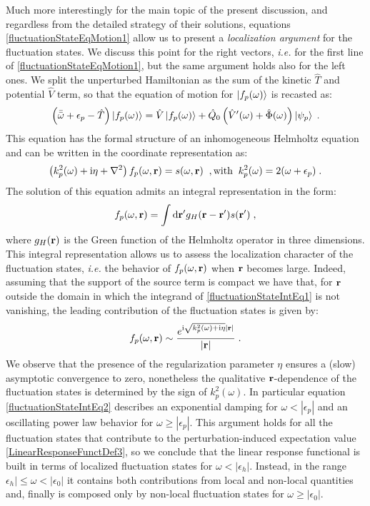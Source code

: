 \documentclass[a4paper]{article}
\newcommand{\dd}{{\rm d}}
\renewcommand{\r}{{\bf r}}
\newcommand{\eps}{\epsilon}
\newcommand{\bbomega}{{\bar{\bar\omega}}}
\newcommand{\ii}{\mathrm{i}}
\newcommand{\be}{\begin{equation}}
\newcommand{\ee}{\end{equation}}
\newcommand{\lb}{\label}
\newcommand{\op}[1]{\hat {#1}}
\begin{document}
Much more interestingly for the main topic of the present discussion, and regardless from the detailed strategy of their solutions, equations \eqref{fluctuationStateEqMotion1} 
allow us to present a \emph{localization argument} for the fluctuation states. We discuss this point for the right vectors, \emph{i.e.} for the first line of \eqref{fluctuationStateEqMotion1}, 
but the same argument holds also for the left ones. We split the unperturbed Hamiltonian as the sum of the kinetic $\op T$ and potential $\op V$ term, so that the equation of motion 
for $\ket{f_p(\omega)}$ is recasted as:
\be\lb{fluctuationStateEqMotion}
\left(\bbomega+\eps_p -\op T\right)\ket{f_p(\omega)} = \op V\ket{f_p(\omega)} + \op Q_0\left(\op V'(\omega) + \op \Phi(\omega)\right)\ket{\psi_p} \;.
\ee
This equation has the formal structure of an inhomogeneous Helmholtz equation and can be written in the coordinate representation as:
\be
\left(k^2_p(\omega)+\ii\eta + \nabla^2\right)f_p(\omega,\r) = s(\omega,\r) \;\;, {\rm with} \;\; k^2_p(\omega) = 2(\omega+\eps_p) \;.
\ee
The solution of this equation admits an integral representation in the form:
\be\lb{fluctuationStateIntEq1}
f_p(\omega,\r) = \int \dd\r' g_H(\r-\r')s(\r') \;,
\ee
where $g_H(\r)$ is the Green function of the Helmholtz operator in three dimensions. This integral representation allows us to assess the localization character 
of the fluctuation states, \emph{i.e.} the behavior of $f_p(\omega,\r)$ when $\r$ becomes large. Indeed, assuming that the support of the source term is compact
we have that, for $\r$ outside the domain in which the integrand of \eqref{fluctuationStateIntEq1} is not vanishing, the leading contribution of the fluctuation states
is given by:
\be\lb{fluctuationStateIntEq2}
f_p(\omega,\r) \sim \frac{e^{\ii \sqrt{k^2_p(\omega)+\ii\eta} |\r|}}{|\r|} \;.
\ee
We observe that the presence of the regularization parameter $\eta$ ensures a (slow) asymptotic convergence to zero, nonetheless the qualitative $\r$-dependence of the fluctuation 
states is determined by the sign of $k^2_p(\omega)$. In particular equation \eqref{fluctuationStateIntEq2} describes an exponential damping for $\omega < |\eps_p|$ and an oscillating 
power law behavior for $\omega \geq |\eps_p|$.
This argument holds for all the fluctuation states that contribute to the perturbation-induced expectation value \eqref{LinearResponseFunctDef3}, so we conclude that
the linear response functional is built in terms of localized fluctuation states for $\omega < |\eps_h|$. Instead, in the range $\eps_h|\leq\omega<|\eps_0|$ it contains both
contributions from local and non-local quantities and, finally is composed only by non-local fluctuation states for $\omega\geq|\eps_0|$. 
\end{document}
